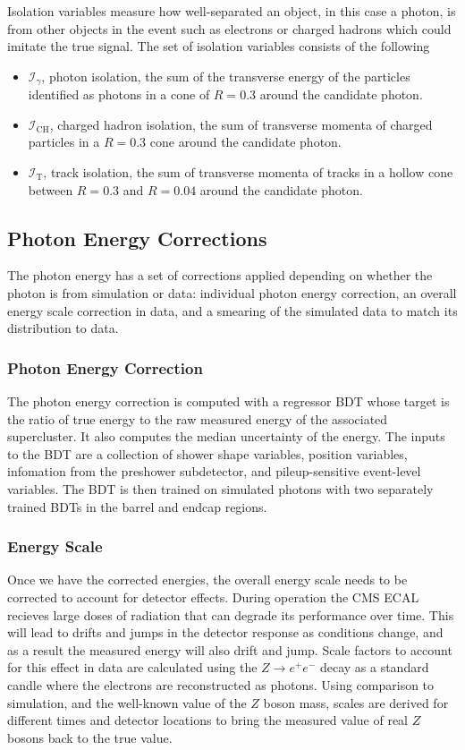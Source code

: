 Isolation variables measure how well-separated an object, in this case a photon, is from other objects in the event such as electrons or charged hadrons which could imitate the true signal. The set of isolation variables consists of the following
\begin{itemize}[leftmargin=.5in,noitemsep]
    \item $\mathcal{I}_{\gamma}$, photon isolation, the sum of the transverse energy of the particles identified as photons in a cone of $R=0.3$ around the candidate photon.
    \item $\mathcal{I}_{\mathrm{CH}}$, charged hadron isolation, the sum of transverse momenta of charged particles in a $R=0.3$ cone around the candidate photon. 
    \item $\mathcal{I}_{\mathrm{T}}$, track isolation, the sum of transverse momenta of tracks in a hollow cone between $R=0.3$ and $R=0.04$ around the candidate photon.
\end{itemize}



\subsection{Photon Energy Corrections}

The photon energy has a set of corrections applied depending on whether the photon is from simulation or data: individual photon energy correction, an overall energy scale correction in data, and a smearing of the simulated data to match its distribution to data. 

\subsubsection{Photon Energy Correction}
The photon energy correction is computed with a regressor BDT whose target is the ratio of true energy to the raw measured energy of the associated supercluster. It also computes the median uncertainty of the energy. 
The inputs to the BDT are a collection of shower shape variables, position variables, infomation from the preshower subdetector, and pileup-sensitive event-level variables.
The BDT is then trained on simulated photons with two separately trained BDTs in the barrel and endcap regions. 


\subsubsection{Energy Scale}
Once we have the corrected energies, the overall energy scale needs to be corrected to account for detector effects. 
During operation the CMS ECAL recieves large doses of radiation that can degrade its performance over time. 
This will lead to drifts and jumps in the detector response as conditions change, and as a result the measured energy will also drift and jump. 
Scale factors to account for this effect in data are calculated using the $Z\rightarrow{}e^{+}e^{-}$ decay as a standard candle where the electrons are reconstructed as photons. 
Using comparison to simulation, and the well-known value of the $Z$ boson mass, scales are derived for different times and detector locations to bring the measured value of real $Z$ bosons back to the true value. 


